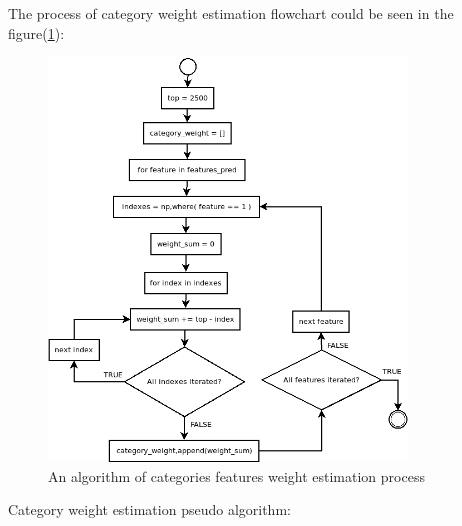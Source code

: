 The process of category weight estimation flowchart could be seen in the figure(\ref{fig:category_weight_estimation}):
\begin{figure}[H]
    \centering
    \includegraphics[width=0.85\textwidth]{Pictures/category_weight_estimation.png}
    \caption{\label{fig:category_weight_estimation}{} An algorithm of categories features weight estimation process}
\end{figure}


Category weight estimation pseudo algorithm:


